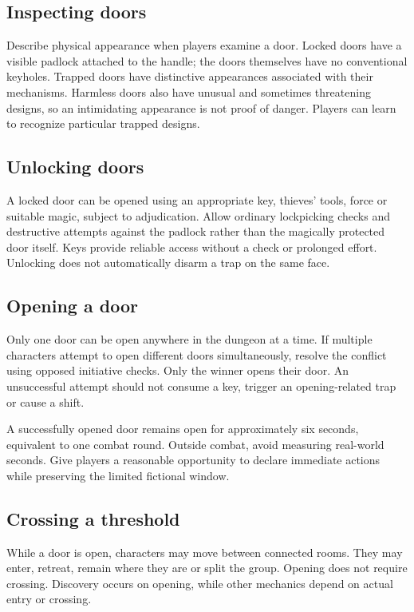 \subsection{Inspecting doors}

Describe physical appearance when players examine a door. Locked doors have a visible padlock attached to the handle; the doors themselves have no conventional keyholes. Trapped doors have distinctive appearances associated with their mechanisms. Harmless doors also have unusual and sometimes threatening designs, so an intimidating appearance is not proof of danger. Players can learn to recognize particular trapped designs.

\subsection{Unlocking doors}

A locked door can be opened using an appropriate key, thieves' tools, force or suitable magic, subject to adjudication. Allow ordinary lockpicking checks and destructive attempts against the padlock rather than the magically protected door itself. Keys provide reliable access without a check or prolonged effort. Unlocking does not automatically disarm a trap on the same face.

\subsection{Opening a door}

Only one door can be open anywhere in the dungeon at a time. If multiple characters attempt to open different doors simultaneously, resolve the conflict using opposed initiative checks. Only the winner opens their door. An unsuccessful attempt should not consume a key, trigger an opening-related trap or cause a shift.

A successfully opened door remains open for approximately six seconds, equivalent to one combat round. Outside combat, avoid measuring real-world seconds. Give players a reasonable opportunity to declare immediate actions while preserving the limited fictional window.

\subsection{Crossing a threshold}

While a door is open, characters may move between connected rooms. They may enter, retreat, remain where they are or split the group. Opening does not require crossing. Discovery occurs on opening, while other mechanics depend on actual entry or crossing.


